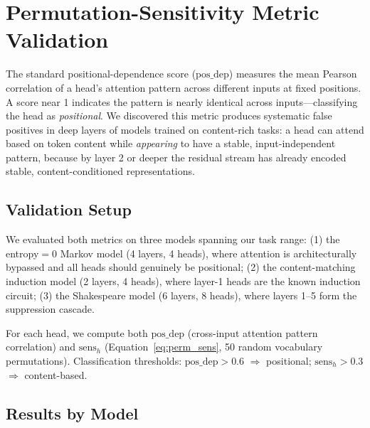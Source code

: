 
\appendix

\section{Permutation-Sensitivity Metric Validation}
\label{app:metric_validation}

The standard positional-dependence score ($\text{pos\_dep}$) measures the mean Pearson correlation
of a head's attention pattern across different inputs at fixed positions. A score near 1 indicates
the pattern is nearly identical across inputs---classifying the head as \emph{positional}. We
discovered this metric produces systematic false positives in deep layers of models trained on
content-rich tasks: a head can attend based on token content while \emph{appearing} to have a
stable, input-independent pattern, because by layer 2 or deeper the residual stream has already
encoded stable, content-conditioned representations.

\subsection{Validation Setup}

We evaluated both metrics on three models spanning our task range:
(1) the entropy$=$0 Markov model (4 layers, 4 heads), where attention is architecturally
bypassed and all heads should genuinely be positional;
(2) the content-matching induction model (2 layers, 4 heads), where layer-1 heads are the
known induction circuit;
(3) the Shakespeare model (6 layers, 8 heads), where layers 1--5 form the suppression cascade.

For each head, we compute both $\text{pos\_dep}$ (cross-input attention pattern correlation)
and $\text{sens}_h$ (Equation~\ref{eq:perm_sens}, 50 random vocabulary permutations).
Classification thresholds: $\text{pos\_dep} > 0.6$ $\Rightarrow$ positional;
$\text{sens}_h > 0.3$ $\Rightarrow$ content-based.

\subsection{Results by Model}

